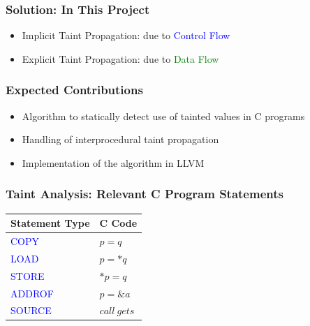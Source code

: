 \documentclass[xcolor=dvipsnames]{beamer}
\begin{document}
\begin{frame}
  \frametitle{Solution: In This Project} {\Large
   \begin{itemize}
	\item Implicit Taint Propagation: due to \textcolor{blue}{Control Flow}
   	\vspace{0.5cm}	
	\item Explicit Taint Propagation: due to \textcolor{green}{Data Flow}
	\end{itemize}
	}
\end{frame}

\begin{frame}
  \frametitle{Expected Contributions} 
	{\Large
	\begin{itemize}
	\item Algorithm to statically detect use of tainted values in C programs
   	\vspace{0.5cm}
	\item Handling of interprocedural taint propagation
   	\vspace{0.5cm}   	
	\item Implementation of the algorithm in LLVM
	\end{itemize}
	}
\end{frame}

\begin{frame}
  \frametitle{Taint Analysis: Relevant C Program Statements} 
	\Large
\begin{center}
\begin{tabular}{|l|l|}
\hline
Statement Type 				& C Code 			\\ \hline
\hline
\textcolor{blue}{COPY}		& $p = q$				\\	\hline
\textcolor{blue}{LOAD}		& $p = *q$				\\ 	\hline
\textcolor{blue}{STORE}		& $*p = q$				\\ 	\hline
\textcolor{blue}{ADDROF}	& $p = \&a$				\\ 	\hline
\textcolor{blue}{SOURCE}	& $\mathit{call\ gets}  $ \\ 	\hline
\end{tabular}
\end{center}    	
\end{frame}
\end{document}
